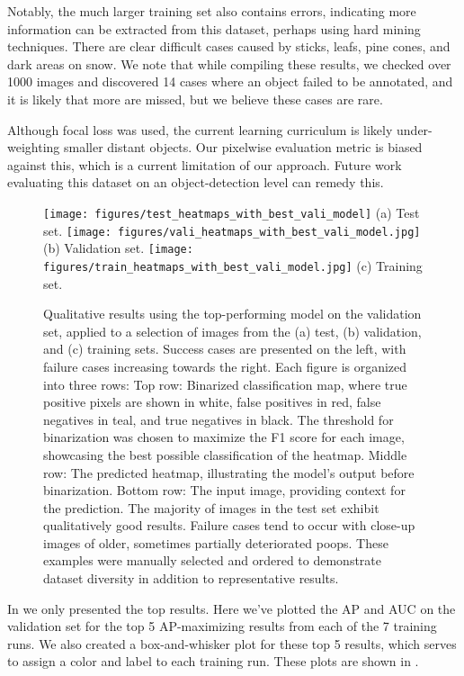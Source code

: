 Notably, the much larger training set also contains errors, indicating more information can be extracted
  from this dataset, perhaps using hard mining techniques.
There are clear difficult cases caused by sticks, leafs, pine cones, and dark areas on snow.
We note that while compiling these results, we checked over 1000 images and discovered 14 cases where an
  object failed to be annotated, and it is likely that more are missed, but we believe these cases are rare.

Although focal loss was used, the current learning curriculum is likely under-weighting smaller distant
  objects.
Our pixelwise evaluation metric is biased against this, which is a current limitation of our approach.
Future work evaluating this dataset on an object-detection level can remedy this.

\begin{figure*}[ht]
\centering
\texttt{[image: figures/test\_heatmaps\_with\_best\_vali\_model]}%
\hfill
(a) Test set.
\texttt{[image: figures/vali\_heatmaps\_with\_best\_vali\_model.jpg]}%
\hfill
(b) Validation set.
\texttt{[image: figures/train\_heatmaps\_with\_best\_vali\_model.jpg]}%
\hfill
(c) Training set.
\caption[]{
    Qualitative results using the top-performing model on the validation set, applied to a selection of images
      from the (a) test, (b) validation, and (c) training sets.
    Success cases are presented on the left, with failure cases increasing towards the right.
    Each figure is organized into three rows:
    Top row:
    Binarized classification map, where true positive pixels are shown in white, false positives in red, false
      negatives in teal, and true negatives in black.
    The threshold for binarization was chosen to maximize the F1 score for each image, showcasing the best
      possible classification of the heatmap.
    Middle row:
    The predicted heatmap, illustrating the model's output before binarization.
    Bottom row:
    The input image, providing context for the prediction.
    The majority of images in the test set exhibit qualitatively good results.
    Failure cases tend to occur with close-up images of older, sometimes partially deteriorated poops.
    These examples were manually selected and ordered to demonstrate dataset
    diversity in addition to representative results.
}
\label{fig:test_heatmaps_with_best_vali_model}
\end{figure*}


In  we only presented the top results.
Here we've plotted the AP and AUC on the validation set for the top 5 AP-maximizing results from each of the
  7 training runs.
We also created a box-and-whisker plot for these top 5 results, which serves to assign a color and label to
  each training run.
These plots are shown in .


